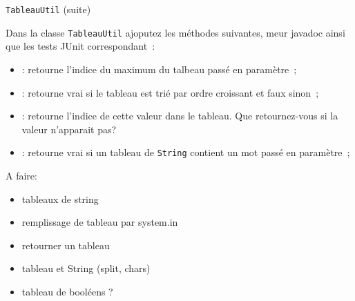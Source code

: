 \documentclass[a4paper,11pt]{article}
\begin{document}
	\begin{Exercice}{\texttt{TableauUtil} (suite)}	

		Dans la classe \texttt{TableauUtil} ajoputez les méthodes suivantes, meur javadoc ainsi que les tests JUnit correspondant~:
	\begin{itemize}
		\item {}: 
				retourne l'indice du maximum du talbeau passé en paramètre~;
		\item {}: 
				retourne vrai si le tableau est trié par ordre croissant et 	
				faux sinon~;
		\item {}: 
				retourne l'indice de cette valeur dans le tableau. 
				Que retournez-vous si la valeur n'apparait pas?
		\item  {}: 
			retourne vrai si un tableau de \texttt{String} contient un mot passé en
			paramètre~;
%	
	\end{itemize}
	\end{Exercice}
	
	A faire:	
\begin{itemize}
	\item tableaux de string
	\item remplissage de tableau par system.in
	\item retourner un tableau
	\item tableau et String (split, chars)
	\item tableau de booléens ?
\end{itemize}	
\end{document}
